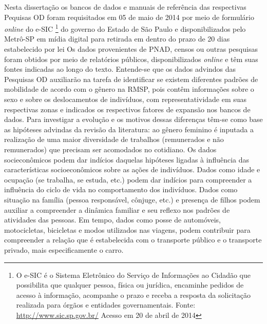 Nesta dissertação os bancos de dados e manuais de referência das respectivas Pequisas OD foram requisitados em 05 de maio de 2014 por meio de formulário \emph{online} do e-SIC%
\footnote{O e-SIC é o Sistema Eletrônico do Serviço de Informações ao Cidadão que possibilita que qualquer pessoa, física ou jurídica, encaminhe pedidos de acesso à informação, acompanhe o prazo e receba a resposta da solicitação realizada para órgãos e entidades governamentais. Fonte: \url{http://www.sic.sp.gov.br/} Acesso em 20 de abril de 2014} do governo do Estado de São Paulo e disponibilizados pelo Metrô-SP em mídia digital para retirada em dentro do prazo de 20 dias estabelecido por lei %
Os dados provenientes de PNAD, censos ou outras pesquisas foram obtidos por meio de relatórios públicos, disponibilizados \emph{online} e têm suas fontes indicadas ao longo do texto. Entende-se que os dados advindos das Pesquisas OD auxiliarão na tarefa de identificar se existem diferentes padrões de mobilidade de acordo com o gênero na RMSP, pois contêm informações sobre o sexo e sobre os deslocamentos de indivíduos, com representatividade em suas respectivas zonas e indicados os respectivos fatores de expansão nos bancos de dados. Para investigar a evolução e os motivos dessas diferenças têm-se como base as hipóteses advindas da revisão da literatura: ao gênero feminino é inputada a realização de uma maior diversidade de trabalhos (remunerados e não remunerados) que precisam ser acomodados no cotidiano. Os dados socieconômicos podem dar indícios daquelas hipóteses ligadas à influência das características socioeconômicos sobre as ações de indivíduos. Dados como idade e ocupação (se trabalha, se estuda, etc.) podem dar indícios para compreender a influência do ciclo de vida no comportamento dos indivíduos. Dados como situação na família (pessoa responsável, cônjuge, etc.) e presença de filhos podem auxiliar a compreender a dinâmica familiar e seu reflexo nos padrões de atividades das pessoas. Em tempo, dados como posse de automóveis, motocicletas, bicicletas e modos utilizados nas viagens, podem contribuir para compreender a relação que é estabelecida com o transporte público e o transporte privado, mais especificamente o carro. 

